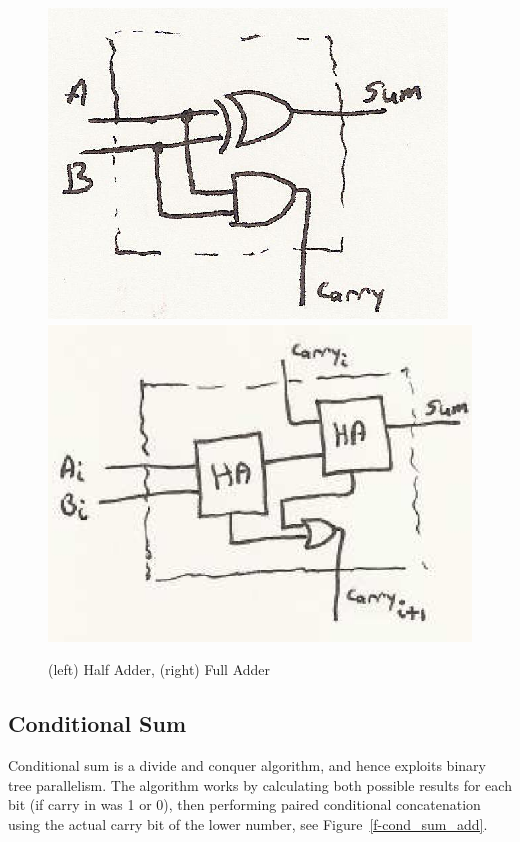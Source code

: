 \begin{figure}
\caption{(left) Half Adder, (right) Full Adder}\label{f-half_full_add}
\begin{center}
\includegraphics{ha.eps} \hspace{.2in} \includegraphics{fa.eps}
\end{center}
\end{figure}

\subsection{Conditional Sum}
Conditional sum is a divide and conquer algorithm, and hence exploits binary tree parallelism.  The algorithm works by calculating both possible results for each bit (if carry in was 1 or 0), then performing paired conditional concatenation using the actual carry bit of the lower number, see Figure~\ref{f-cond_sum_add}.

